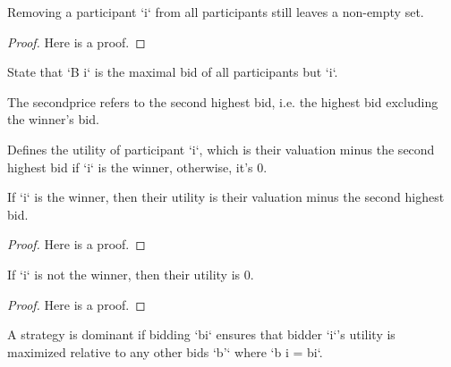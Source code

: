 \begin{lemma}\label{delete_i_nonempty}
    \leanok
    Removing a participant `i` from all participants still leaves a non-empty set.
\end{lemma}
\begin{proof}
    Here is a proof.
\end{proof}

\begin{definition}\label{B}
    \leanok
    State that `B i` is the maximal bid of all participants but `i`.
\end{definition}

\begin{definition}\label{secondprice}
    \leanok
    The secondprice refers to the second highest bid, i.e. the highest bid excluding the winner’s bid.
\end{definition}

\begin{definition}\label{utility}
    \leanok
    Defines the utility of participant `i`, which is their valuation minus the second highest bid if `i` is the winner, otherwise, it's 0.
\end{definition}

\begin{lemma}\label{utility_winner}
    \leanok
    If `i` is the winner, then their utility is their valuation minus the second highest bid.
\end{lemma}
\begin{proof}
    Here is a proof.
\end{proof}

\begin{lemma}\label{utility_loser}
    \leanok
    If `i` is not the winner, then their utility is 0.
\end{lemma}
\begin{proof}
    Here is a proof.
\end{proof}

\begin{definition}\label{dominant}
    \leanok
    A strategy is dominant if bidding `bi` ensures that bidder `i`'s utility is maximized relative to any other bids `b'` where `b i = bi`.
\end{definition}


